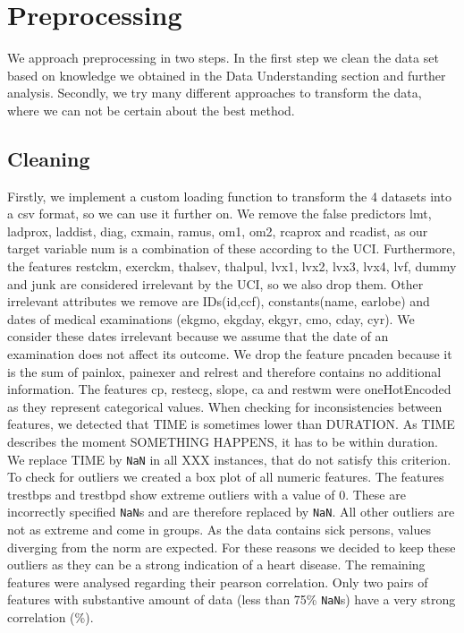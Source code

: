 \chapter{Preprocessing}
We approach preprocessing in two steps. In the first step we clean the data set based on knowledge we obtained in the Data Understanding section and further analysis. 
Secondly, we try many different approaches to transform the data, where we can not be certain about the best method. 

\section{Cleaning}
Firstly, we implement a custom loading function to transform the 4 datasets into a csv format, so we can use it further on.
We remove the false predictors lmt, ladprox, laddist, diag, cxmain, ramus, om1, om2, rcaprox and rcadist, as our target variable num is a combination of these according to the UCI. %
Furthermore, the features restckm, exerckm, thalsev, thalpul, lvx1, lvx2, lvx3, lvx4, lvf, dummy and junk are considered irrelevant by the UCI, so we also drop them. Other irrelevant attributes we remove are IDs(id,ccf), constants(name, earlobe) and dates of medical examinations (ekgmo, ekgday, ekgyr, cmo, cday, cyr). We consider these dates irrelevant because we assume that the date of  an examination does not affect its outcome. 
We drop the feature pncaden because it is the sum of painlox, painexer and relrest and therefore contains no additional information. 
The features cp, restecg, slope, ca and restwm were oneHotEncoded as they represent categorical values.
When checking for inconsistencies between features, we detected that TIME is sometimes lower than DURATION. As TIME describes the moment SOMETHING HAPPENS, it has to be within duration. We replace TIME by \texttt{NaN} in all XXX instances, that do not satisfy this criterion. 
To check for outliers we created a box plot of all numeric features. The features trestbps and trestbpd show extreme outliers with a value of 0. These are incorrectly specified \texttt{NaN}s and are therefore replaced by \texttt{NaN}. All other outliers are not as extreme and come in groups. As the data contains sick persons, values diverging from the norm are expected. For these reasons we decided to keep these outliers as they can be a strong indication of a heart disease.
The remaining features were analysed regarding their pearson correlation. Only two pairs of features with substantive amount of data (less than 75\% \texttt{NaN}s) have a very strong correlation (\%).  
